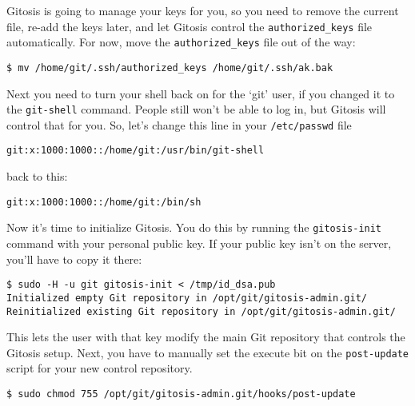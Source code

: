 \documentclass[a4paper]{book}
\begin{document}
Gitosis is going to manage your keys for you, so you need to remove the current file, re-add the keys later, and let Gitosis control the \texttt{authorized\_keys} file automatically. For now, move the \texttt{authorized\_keys} file out of the way:

\begin{shaded}\begin{verbatim}
$ mv /home/git/.ssh/authorized_keys /home/git/.ssh/ak.bak
\end{verbatim}\end{shaded}

Next you need to turn your shell back on for the `git' user, if you changed it to the \texttt{git-shell} command. People still won't be able to log in, but Gitosis will control that for you. So, let's change this line in your \texttt{/etc/passwd} file

\begin{shaded}\begin{verbatim}
git:x:1000:1000::/home/git:/usr/bin/git-shell
\end{verbatim}\end{shaded}

back to this:

\begin{shaded}\begin{verbatim}
git:x:1000:1000::/home/git:/bin/sh
\end{verbatim}\end{shaded}

Now it's time to initialize Gitosis. You do this by running the \texttt{gitosis-init} command with your personal public key. If your public key isn't on the server, you'll have to copy it there:

\begin{shaded}\begin{verbatim}
$ sudo -H -u git gitosis-init < /tmp/id_dsa.pub
Initialized empty Git repository in /opt/git/gitosis-admin.git/
Reinitialized existing Git repository in /opt/git/gitosis-admin.git/
\end{verbatim}\end{shaded}

This lets the user with that key modify the main Git repository that controls the Gitosis setup. Next, you have to manually set the execute bit on the \texttt{post-update} script for your new control repository.

\begin{shaded}\begin{verbatim}
$ sudo chmod 755 /opt/git/gitosis-admin.git/hooks/post-update
\end{verbatim}\end{shaded}
\end{document}
